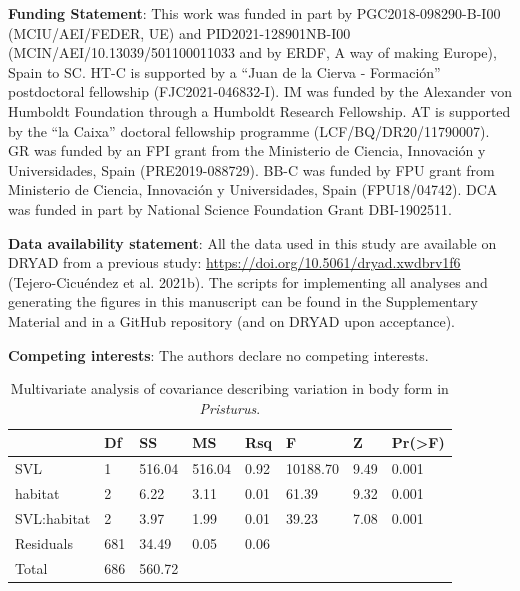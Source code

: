 \documentclass[
  11pt,
]{article}
\begin{document}
\textbf{Funding Statement}: This work was funded in part by
PGC2018-098290-B-I00 (MCIU/AEI/FEDER, UE) and PID2021-128901NB-I00
(MCIN/AEI/10.13039/501100011033 and by ERDF, A way of making Europe),
Spain to SC. HT-C is supported by a ``Juan de la Cierva - Formación''
postdoctoral fellowship (FJC2021-046832-I). IM was funded by the
Alexander von Humboldt Foundation through a Humboldt Research
Fellowship. AT is supported by the ``la Caixa'' doctoral fellowship
programme (LCF/BQ/DR20/11790007). GR was funded by an FPI grant from the
Ministerio de Ciencia, Innovación y Universidades, Spain
(PRE2019-088729). BB-C was funded by FPU grant from Ministerio de
Ciencia, Innovación y Universidades, Spain (FPU18/04742). DCA was funded
in part by National Science Foundation Grant DBI-1902511.

\textbf{Data availability statement}: All the data used in this study
are available on DRYAD from a previous study:
\url{https://doi.org/10.5061/dryad.xwdbrv1f6} (Tejero-Cicuéndez et al.
2021b). The scripts for implementing all analyses and generating the
figures in this manuscript can be found in the Supplementary Material
and in a GitHub repository (and on DRYAD upon acceptance).

\textbf{Competing interests}: The authors declare no competing
interests.

\newpage

\begin{table}[H]

\caption{\label{tab:unnamed-chunk-1}Multivariate analysis of covariance describing variation in body form in \textit{Pristurus}.}
\centering
\begin{tabular}[t]{llllllll}
\toprule
  & Df & SS & MS & Rsq & F & Z & Pr(>F)\\
\midrule
SVL & 1 & 516.04 & 516.04 & 0.92 & 10188.70 & 9.49 & 0.001\\
habitat & 2 & 6.22 & 3.11 & 0.01 & 61.39 & 9.32 & 0.001\\
SVL:habitat & 2 & 3.97 & 1.99 & 0.01 & 39.23 & 7.08 & 0.001\\
Residuals & 681 & 34.49 & 0.05 & 0.06 &  &  & \\
Total & 686 & 560.72 &  &  &  &  & \\
\bottomrule
\end{tabular}
\end{table}

\newpage
\end{document}
